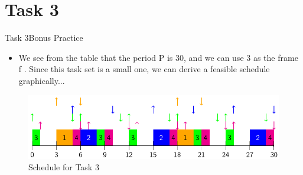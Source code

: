 
\section{Task 3}

\setcounter{task}{1}

\begin{frame}{Task 3}{Bonus Practice\vspace{0.5cm}}
  \begin{itemize}
    \item We see from the table that the period P is 30, and we can use 3 as the frame f . Since this task set is a small one, we can derive a feasible schedule graphically...
  \end{itemize}
  \begin{figure}
    \includegraphics[width=0.7\paperwidth]{./figures/task3_schedule.png}
    \caption{Schedule for Task 3}
  \end{figure}
\end{frame}
